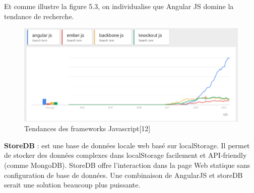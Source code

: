 \documentclass[12pt, ChapStyle1, oneside]{./Styles/Dea_Gsm}
\begin{document}
Et comme illustre la figure 5.3, on individualise que Angular JS domine la tendance de recherche. 
\begin{figure}[H]
    \centering
    \includegraphics[width=6in]{angular}
    \caption{Tendances des frameworks Javascript[12]}
\end{figure}


\textbf{StoreDB} : est une base de données locale web basé sur localStorage. Il permet de stocker des données complexes dans localStorage facilement et API-friendly (comme MongoDB).
StoreDB offre l'interaction dans la page Web statique sans configuration de base de données.
Une combinaison de AngularJS et storeDB serait une solution beaucoup plus puissante.
\end{document}

